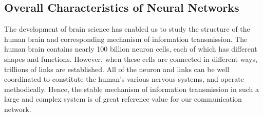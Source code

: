 \documentclass[journal,comsoc]{IEEEtran}
\begin{document}
	\subsection{Overall Characteristics of Neural Networks}
	The development of brain science has enabled us to study the structure of the human brain and corresponding mechanism of information transmission.
	The human brain contains nearly 100 billion neuron cells, each of which has different shapes and functions.
	However, when these cells are connected in different ways, trillions of links are established.
	All of the neuron and links can be well coordinated to constitute the human's various nervous systems, and operate methodically.
	Hence, the stable mechanism of information transmission in such a large and complex system is of great reference value for our communication network.
\end{document}
